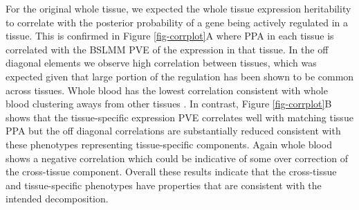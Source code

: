 \documentclass[10pt,letterpaper]{article}
\begin{document}
For the original whole tissue, we expected the whole tissue expression heritability to correlate with the posterior probability of a gene being actively regulated in a tissue. This is confirmed in Figure \ref{fig-corrplot}A where PPA in each tissue is correlated with the BSLMM PVE of the expression in that tissue. In the off diagonal elements we observe high correlation between tissues, which was expected given that large portion of the regulation has been shown to be common across tissues. Whole blood has the lowest correlation  consistent with whole blood clustering aways from other tissues \cite{Ardlie_2015}. In contrast, Figure \ref{fig-corrplot}B shows that the tissue-specific expression PVE correlates well with matching tissue PPA but the off diagonal correlations are substantially reduced consistent with these phenotypes representing tissue-specific components. Again whole blood shows a negative correlation which could be indicative of some over correction of the cross-tissue component. Overall these results indicate that the cross-tissue and tissue-specific phenotypes have properties that are consistent with the intended decomposition.


\end{document}

